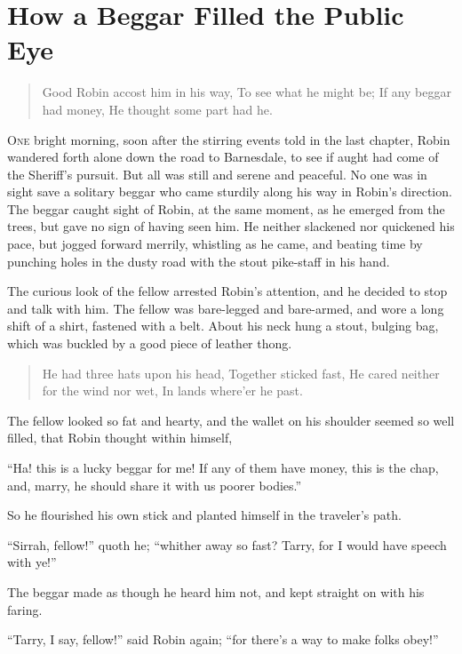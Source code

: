 \chapter{How a Beggar Filled the Public Eye}

\begin{quote}
Good Robin accost him in his way,
To see what he might be;
If any beggar had money,
He thought some part had he.
\end{quote}

\lettrine{O}{ne} bright morning, soon after the stirring events told in the last
chapter, Robin wandered forth alone down the road to Barnesdale, to see
if aught had come of the Sheriff's pursuit. But all was still and serene
and peaceful. No one was in sight save a solitary beggar who came
sturdily along his way in Robin's direction. The beggar caught sight of
Robin, at the same moment, as he emerged from the trees, but gave no
sign of having seen him. He neither slackened nor quickened his pace,
but jogged forward merrily, whistling as he came, and beating time by
punching holes in the dusty road with the stout pike-staff in his hand.

The curious look of the fellow arrested Robin's attention, and he
decided to stop and talk with him. The fellow was bare-legged and
bare-armed, and wore a long shift of a shirt, fastened with a belt.
About his neck hung a stout, bulging bag, which was buckled by a good
piece of leather thong.

\begin{quote}
He had three hats upon his head,
Together sticked fast,
He cared neither for the wind nor wet,
In lands where’er he past.
\end{quote}

The fellow looked so fat and hearty, and the wallet on his shoulder
seemed so well filled, that Robin thought within himself,

``Ha! this is a lucky beggar for me! If any of them have money, this is
the chap, and, marry, he should share it with us poorer bodies.''

So he flourished his own stick and planted himself in the traveler's
path.

``Sirrah, fellow!'' quoth he; ``whither away so fast? Tarry, for I would
have speech with ye!''

The beggar made as though he heard him not, and kept straight on with
his faring.

``Tarry, I say, fellow!'' said Robin again; ``for there's a way to make
folks obey!''

